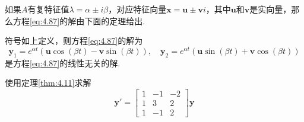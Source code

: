 如果$A$有复特征值$\lambda=\alpha\pm i\beta$，对应特征向量$\mathbf{x}=\mathbf{u}\pm\mathbf{v}i$，其中$\mathbf{u}$和$\mathbf{v}$是实向量，那么方程\ref{eq:4.87}的解由下面的定理给出.
\begin{theorem}\label{thm:4.11}
    符号如上定义，则方程\ref{eq:4.87}的解为
    \[
        \mathbf{y}_1=e^{\alpha t}(\mathbf{u}\cos(\beta t)-\mathbf{v}\sin(\beta t)),\quad \mathbf{y}_2=e^{\alpha t}(\mathbf{u}\sin(\beta t)+\mathbf{v}\cos(\beta t))
    \]
    是方程\ref{eq:4.87}的线性无关的解.
\end{theorem}

\begin{example}
    使用定理\ref{thm:4.11}求解
    \begin{equation}\label{eq:4.88}
        \mathbf{y}'=\begin{bmatrix}
            1 & -1 & -2 \\
            1 & 3  & 2  \\
            1 & -1 & 2
        \end{bmatrix}\mathbf{y}
    \end{equation}
\end{example}

